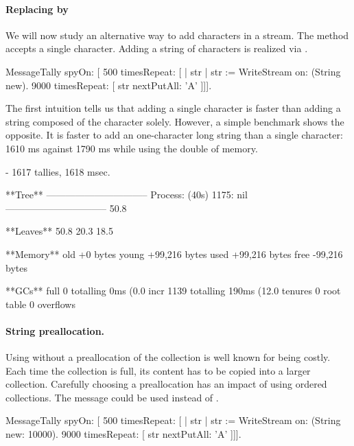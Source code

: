 \documentclass[a4paper,10pt,twoside]{book}
\begin{document}
\paragraph{Replacing  by } We will now study an alternative way to add characters in a stream. The  method accepts a single character. Adding a string of characters is realized via .

\begin{code}{}
MessageTally spyOn: 
    [ 500 timesRepeat: [
                    | str |  
                    str := WriteStream on: (String new). 
                    9000 timesRepeat: [ str nextPutAll: 'A' ]]].
\end{code}

The first intuition tells us that adding a single character is faster than adding a string composed of the character solely. However, a simple benchmark shows the opposite. It is faster to add an one-character long string than a single character: 1610 ms against 1790 ms while using the double of memory.

\begin{code}{}
 - 1617 tallies, 1618 msec.

**Tree**
--------------------------------
Process: (40s)  1175: nil
--------------------------------
50.8%

**Leaves**
50.8%
20.3%
18.5%

**Memory**
	old			+0 bytes
	young		+99,216 bytes
	used		+99,216 bytes
	free		-99,216 bytes

**GCs**
	full			0 totalling 0ms (0.0%
	incr		1139 totalling 190ms (12.0%
	tenures		0
	root table	0 overflows
\end{code}



\paragraph{String preallocation.} Using  without a preallocation of the collection is well known for being costly. Each time the collection is full, its content has to be copied into a larger collection. Carefully choosing a preallocation has an impact of using ordered collections. The message  could be used instead of .

\begin{code}{}
MessageTally spyOn: 
    [ 500 timesRepeat: [
                    | str |  
                    str := WriteStream on: (String new: 10000). 
                    9000 timesRepeat: [ str nextPutAll: 'A' ]]].
\end{code}
\end{document}
